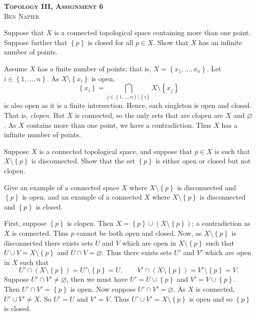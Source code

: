\documentclass[a4paper, answers]{exam}
\begin{document}
\begin{center}
	\textbf{\textsc{Topology III, Assignment 6}}
	\\
	\textsc{Ben Napier}
	\vspace{1em}
\end{center}

\begin{questions}
	\question
	Suppose that $X$ is a connected topological space
	containing more than one point.
	Suppose further that $\left\{
		p
	\right\}$ is closed for all $p \in X$.
	Show that $X$ has an infinite number of points.
	\begin{solution}
		Assume $X$ has a finite number of points; that is,
		$X = \left\{
			x_1, \ldots, x_n
		\right\}$.
		Let $i \in \left\{
			1, \ldots, n
		\right\}$.
		As $X \setminus \left\{
			x_i
		\right\}$ is open, 
		\[
			\left\{
				x_i
			\right\} = \bigcap_{j \in \left\{
				1, \ldots, n
			\right\} \setminus \left\{
				i
			\right\}} X \setminus \left\{
				x_j
			\right\}
		\]
		is also open as it is a finite intersection.
		Hence, each singleton is open and closed.
		That is, \emph{clopen}.
		But $X$ is connected, so the only sets that are clopen are
		$X$ and $\varnothing$.
		As $X$ contains more than one point, we have a contradiction.
		Thus $X$ has a infinite number of points.
	\end{solution}

	\question
	Suppose $X$ is a connected topological space,
	and suppose that $p \in X$ is such that
	$X \setminus \left\{
		p
	\right\}$
	is disconnected.
	Show that the set $\left\{
		p
	\right\}$ is either open or closed but not clopen.

	Give an example of a connected space $X$ where
	$X \setminus \left\{
		p
	\right\}$
	is disconnected and $\left\{
		p
	\right\}$
	is open, and an example of a connected $X$ where
	$X \setminus \left\{
		p
	\right\}$
	is disconnected and $\left\{
		p
	\right\}$
	is closed.
	\begin{solution}
		First, suppose $\left\{
			p
		\right\}$ is clopen.
		Then $X = \left\{
			p
		\right\} \cup \left( 
			X \setminus \left\{
				p
			\right\} 
		\right)$;
		a contradiction as $X$ is connected.
		Thus $p$ cannot be both open and closed.
		Now, as $X \setminus \left\{
			p
		\right\}$ is disconnected there exists sets $U$ and $V$ which
		are open in $X \setminus \left\{
			p
		\right\}$ such that $U \cup V = X \setminus \left\{
			p
		\right\}$ and $U \cap V = \varnothing$.
		Thus there exists sets $U'$ and $V'$ which are open in $X$ such that
		\[
			U' \cap (X \setminus \left\{
				p
			\right\}) = U' \setminus \left\{
				p
			\right\} = U, \qquad
			V' \cap \left( 
				X \setminus \left\{
					p
				\right\} 
			\right) = V' \setminus \left\{
				p
			\right\} = V.
		\]
		Suppose $U' \cap V' \neq \varnothing$, then we must have
		$U' = U \cup \left\{
			p
		\right\}$ and $V' = V \cup \left\{
			p
		\right\}$.
		Then $U' \cap V' = \left\{
			p
		\right\}$ is open.
		Now suppose $U' \cap V' = \varnothing$.
		As $X$ is connected, $U' \cup V' \neq X$.
		So $U' = U$ and $V' = V$.
		Thus $U' \cup V' = X \setminus \left\{
			p
		\right\}$ is open and so $\left\{
			p
		\right\}$ is closed.


\end{solution}
\end{questions}
\end{document}
